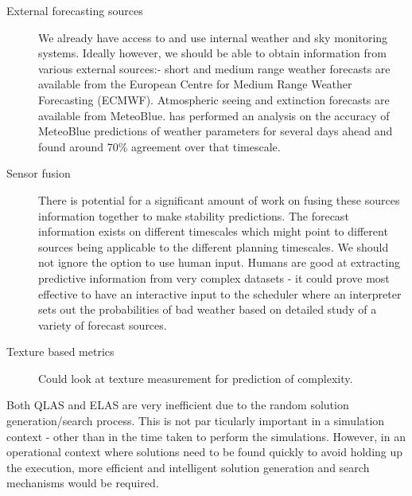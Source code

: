 \begin{description}
\item [External forecasting sources]
We already have access to and use internal weather and sky monitoring systems. Ideally however, we should be able to obtain information from various external sources:- short and medium range weather forecasts are available from the European Centre for Medium Range Weather Forecasting (ECMWF). Atmospheric seeing and extinction forecasts are available from MeteoBlue. \cite{marchant09forecast} has performed an analysis on the accuracy of MeteoBlue predictions of weather parameters for several days ahead and found around 70\% agreement over that timescale. 

\item [Sensor fusion]
There is potential for a significant amount of work on fusing these sources information together to make stability predictions. The forecast information exists on different timescales which might point to different sources being applicable to the different planning timescales. We should not ignore the option to use human input. Humans are good at extracting predictive information from very complex datasets - it could prove most effective to have an interactive input to the scheduler where an interpreter sets out the probabilities of bad weather based on detailed study of a variety of forecast sources. 

\item [Texture based metrics]
Could look at texture measurement for prediction of complexity.

\end{description}

Both QLAS and ELAS are very inefficient due to the random solution generation/search process. This is not par ticularly important in a simulation context - other than in the time taken to perform the simulations. However, in an operational context where solutions need to be found quickly to avoid holding up the execution, more  efficient and intelligent solution generation and search mechanisms would be required.

